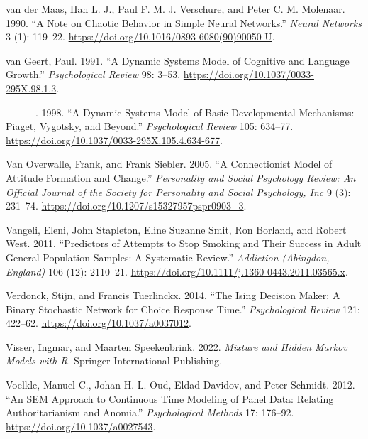 \documentclass[
  a4paper,
  DIV=11,
  numbers=noendperiod,
  oneside]{scrreprt}
\newlength{\cslhangindent}
\newenvironment{CSLReferences}[2] %
 {\begin{list}{}{%
  \setlength{\itemindent}{0pt}
  \setlength{\leftmargin}{0pt}
  \setlength{\parsep}{0pt}
  \ifodd #1
   \setlength{\leftmargin}{\cslhangindent}
   \setlength{\itemindent}{-1\cslhangindent}
  \fi
  \setlength{\itemsep}{#2\baselineskip}}}
 {\end{list}}
\begin{document}
\begin{CSLReferences}{1}{0}
van der Maas, Han L. J., Paul F. M. J. Verschure, and Peter C. M.
Molenaar. 1990. {``A Note on Chaotic Behavior in Simple Neural
Networks.''} \emph{Neural Networks} 3 (1): 119--22.
\url{https://doi.org/10.1016/0893-6080(90)90050-U}.

van Geert, Paul. 1991. {``A Dynamic Systems Model of Cognitive and
Language Growth.''} \emph{Psychological Review} 98: 3--53.
\url{https://doi.org/10.1037/0033-295X.98.1.3}.

---------. 1998. {``A Dynamic Systems Model of Basic Developmental
Mechanisms: {Piaget}, {Vygotsky}, and Beyond.''} \emph{Psychological
Review} 105: 634--77.
\url{https://doi.org/10.1037/0033-295X.105.4.634-677}.

Van Overwalle, Frank, and Frank Siebler. 2005. {``A Connectionist Model
of Attitude Formation and Change.''} \emph{Personality and Social
Psychology Review: An Official Journal of the Society for Personality
and Social Psychology, Inc} 9 (3): 231--74.
\url{https://doi.org/10.1207/s15327957pspr0903_3}.

Vangeli, Eleni, John Stapleton, Eline Suzanne Smit, Ron Borland, and
Robert West. 2011. {``Predictors of Attempts to Stop Smoking and Their
Success in Adult General Population Samples: A Systematic Review.''}
\emph{Addiction (Abingdon, England)} 106 (12): 2110--21.
\url{https://doi.org/10.1111/j.1360-0443.2011.03565.x}.

Verdonck, Stijn, and Francis Tuerlinckx. 2014. {``The {Ising Decision
Maker}: {A} Binary Stochastic Network for Choice Response Time.''}
\emph{Psychological Review} 121: 422--62.
\url{https://doi.org/10.1037/a0037012}.

Visser, Ingmar, and Maarten Speekenbrink. 2022. \emph{Mixture and
{Hidden Markov Models} with {R}}. {Springer International Publishing}.

Voelkle, Manuel C., Johan H. L. Oud, Eldad Davidov, and Peter Schmidt.
2012. {``An {SEM} Approach to Continuous Time Modeling of Panel Data:
{Relating} Authoritarianism and Anomia.''} \emph{Psychological Methods}
17: 176--92. \url{https://doi.org/10.1037/a0027543}.


\end{CSLReferences}
\end{document}
